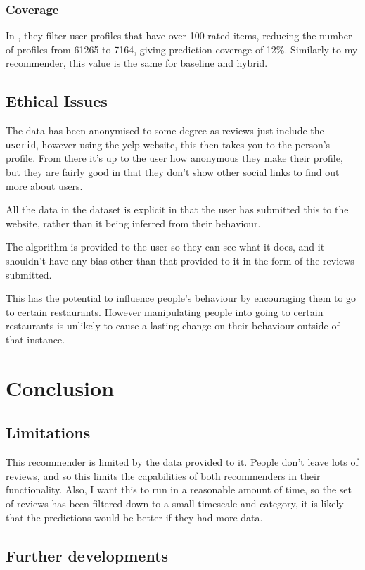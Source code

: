 \documentclass[conference]{IEEEtran}
\begin{document}
\subsubsection{Coverage}

In \cite{evaluation}, they filter user profiles that have over 100 rated items, reducing the number of profiles from 61265 to 7164, giving prediction coverage of 12\%. Similarly to my recommender, this value is the same for baseline and hybrid.

\subsection{Ethical Issues}

The data has been anonymised to some degree as reviews just include the \texttt{userid}, however using the yelp website, this then takes you to the person's profile. From there it's up to the user how anonymous they make their profile, but they are fairly good in that they don't show other social links to find out more about users.

All the data in the dataset is explicit in that the user has submitted this to the website, rather than it being inferred from their behaviour.

The algorithm is provided to the user so they can see what it does, and it shouldn't have any bias other than that provided to it in the form of the reviews submitted.

This has the potential to influence people's behaviour by encouraging them to go to certain restaurants. However manipulating people into going to certain restaurants is unlikely to cause a lasting change on their behaviour outside of that instance.



\section{Conclusion}

\subsection{Limitations}

This recommender is limited by the data provided to it. People don't leave lots of reviews, and so this limits the capabilities of both recommenders in their functionality. Also, I want this to run in a reasonable amount of time, so the set of reviews has been filtered down to a small timescale and category, it is likely that the predictions would be better if they had more data.

\subsection{Further developments}




\end{document}
